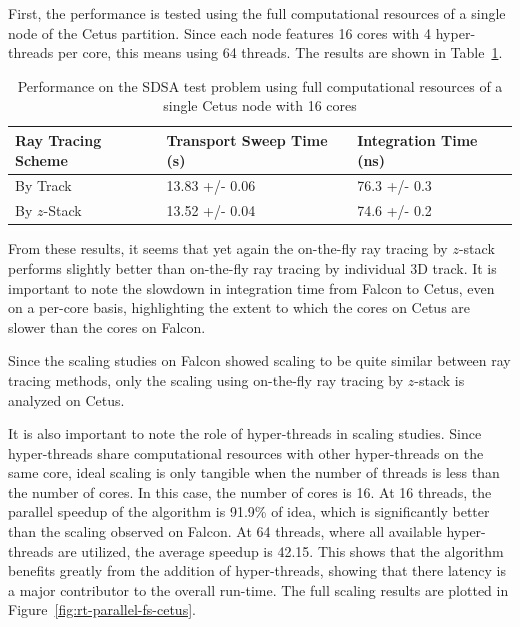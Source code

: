 First, the performance is tested using the full computational resources of a single node of the Cetus partition. Since each node features 16 cores with 4 hyper-threads per core, this means using 64 threads. The results are shown in Table~\ref{tab:rt-full-thread-cetus}.

\begin{table}[ht]
	\centering
	\caption{Performance on the SDSA test problem using full computational resources of a single Cetus node with 16 cores}
	\medskip
	\begin{tabular}{l|l|l}
		\hline
		Ray Tracing Scheme & Transport Sweep Time (s) & Integration Time (ns) \\
		\hline
		By Track & 13.83 +/- 0.06 & 76.3 +/- 0.3 \\
		By $z$-Stack & 13.52 +/- 0.04 & 74.6 +/- 0.2 \\
		\hline
	\end{tabular}
	\label{tab:rt-full-thread-cetus}
\end{table}

From these results, it seems that yet again the on-the-fly ray tracing by $z$-stack performs slightly better than on-the-fly ray tracing by individual 3D track. It is important to note the slowdown in integration time from Falcon to Cetus, even on a per-core basis, highlighting the extent to which the cores on Cetus are slower than the cores on Falcon. 

Since the scaling studies on Falcon showed scaling to be quite similar between ray tracing methods, only the scaling using on-the-fly ray tracing by $z$-stack is analyzed on Cetus. 

It is also important to note the role of hyper-threads in scaling studies. Since hyper-threads share computational resources with other hyper-threads on the same core, ideal scaling is only tangible when the number of threads is less than the number of cores. In this case, the number of cores is 16. At 16 threads, the parallel speedup of the algorithm is 91.9\% of idea, which is significantly better than the scaling observed on Falcon. At 64 threads, where all available hyper-threads are utilized, the average speedup is 42.15. This shows that the algorithm benefits greatly from the addition of hyper-threads, showing that there latency is a major contributor to the overall run-time. The full scaling results are plotted in Figure~\ref{fig:rt-parallel-fs-cetus}.

